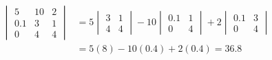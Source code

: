     \begin{equation*}
        \begin{aligned}
            \begin{vmatrix}
                5 & 10 & 2 \\
                0.1 & 3 & 1 \\
                0 & 4 & 4
            \end{vmatrix} &= 5\begin{vmatrix}
                3 & 1 \\
                4 & 4
            \end{vmatrix} - 10\begin{vmatrix}
                0.1 & 1 \\
                0 & 4
            \end{vmatrix} + 2\begin{vmatrix}
                0.1 & 3 \\
                0 & 4
            \end{vmatrix} \\
            &= 5\left(8\right) - 10\left(0.4\right) + 2\left(0.4\right) = 36.8
            \end{aligned}
    \end{equation*}

